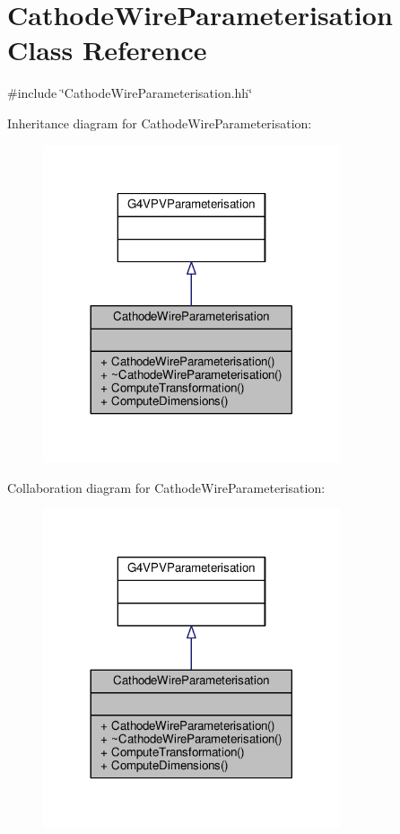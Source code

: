 \hypertarget{classCathodeWireParameterisation}{}\section{Cathode\+Wire\+Parameterisation Class Reference}
\label{classCathodeWireParameterisation}


{\ttfamily \#include \char`\"{}Cathode\+Wire\+Parameterisation.\+hh\char`\"{}}



Inheritance diagram for Cathode\+Wire\+Parameterisation\+:
\nopagebreak
\begin{figure}[H]
\begin{center}
\leavevmode
\includegraphics[width=248pt]{classCathodeWireParameterisation__inherit__graph}
\end{center}
\end{figure}


Collaboration diagram for Cathode\+Wire\+Parameterisation\+:
\nopagebreak
\begin{figure}[H]
\begin{center}
\leavevmode
\includegraphics[width=248pt]{classCathodeWireParameterisation__coll__graph}
\end{center}
\end{figure}
